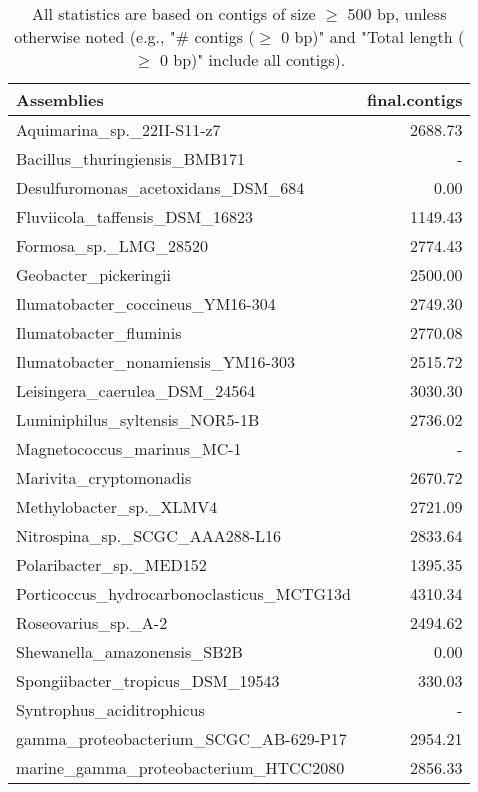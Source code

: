 \documentclass[12pt,a4paper]{article}
\begin{document}
\begin{table}[ht]
\begin{center}
\caption{All statistics are based on contigs of size $\geq$ 500 bp, unless otherwise noted (e.g., "\# contigs ($\geq$ 0 bp)" and "Total length ($\geq$ 0 bp)" include all contigs).}
\begin{tabular}{|l*{1}{|r}|}
\hline
Assemblies & final.contigs \\ \hline
Aquimarina\_sp.\_22II-S11-z7 & 2688.73 \\ \hline
Bacillus\_thuringiensis\_BMB171 & - \\ \hline
Desulfuromonas\_acetoxidans\_DSM\_684 & 0.00 \\ \hline
Fluviicola\_taffensis\_DSM\_16823 & 1149.43 \\ \hline
Formosa\_sp.\_LMG\_28520 & 2774.43 \\ \hline
Geobacter\_pickeringii & 2500.00 \\ \hline
Ilumatobacter\_coccineus\_YM16-304 & 2749.30 \\ \hline
Ilumatobacter\_fluminis & 2770.08 \\ \hline
Ilumatobacter\_nonamiensis\_YM16-303 & 2515.72 \\ \hline
Leisingera\_caerulea\_DSM\_24564 & 3030.30 \\ \hline
Luminiphilus\_syltensis\_NOR5-1B & 2736.02 \\ \hline
Magnetococcus\_marinus\_MC-1 & - \\ \hline
Marivita\_cryptomonadis & 2670.72 \\ \hline
Methylobacter\_sp.\_XLMV4 & 2721.09 \\ \hline
Nitrospina\_sp.\_SCGC\_AAA288-L16 & 2833.64 \\ \hline
Polaribacter\_sp.\_MED152 & 1395.35 \\ \hline
Porticoccus\_hydrocarbonoclasticus\_MCTG13d & 4310.34 \\ \hline
Roseovarius\_sp.\_A-2 & 2494.62 \\ \hline
Shewanella\_amazonensis\_SB2B & 0.00 \\ \hline
Spongiibacter\_tropicus\_DSM\_19543 & 330.03 \\ \hline
Syntrophus\_aciditrophicus & - \\ \hline
gamma\_proteobacterium\_SCGC\_AB-629-P17 & 2954.21 \\ \hline
marine\_gamma\_proteobacterium\_HTCC2080 & 2856.33 \\ \hline
\end{tabular}
\end{center}
\end{table}
\end{document}
